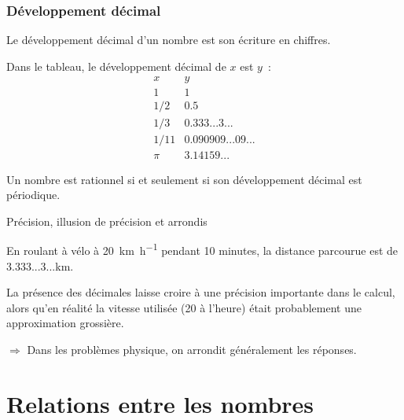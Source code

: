 \documentclass[french,xcolor=svgnames]{beamer}
\begin{document}
\begin{frame}
  \frametitle{Développement décimal}
  Le développement décimal d'un nombre est son écriture \og en chiffres\fg{}.\pause{}

  Dans le tableau, le développement décimal de \(x\) est \(y\)~:\pause{}
  \begin{equation*}
    \begin{array}{cc}
      x & y \\\hline
      1 & 1 \\
      1/2 & 0.5\\
      1/3 & 0.333...3...\\
      1/11 & 0.090909...09...\\
      \pi & 3.14159...
    \end{array}
  \end{equation*}

  \begin{theorem}\pause{}
    Un nombre est rationnel\pause{} si et seulement si son développement décimal est périodique.\pause{}
  \end{theorem}
\end{frame}
\begin{frame}{Précision, illusion de précision et arrondis}
  \begin{example}\pause{}
    En roulant à vélo à \SI{20}{\km\per\hour} pendant 10 minutes, la distance parcourue est de 3.333...3...\si{\km}.
  \end{example}\pause{}

  La présence des décimales laisse croire à une précision importante dans le calcul,\pause{} alors qu'en réalité la vitesse utilisée (20 à l'heure) était probablement une approximation grossière.\pause

  \(\Rightarrow\) Dans les problèmes physique, on arrondit généralement les réponses.\pause{}

\end{frame}

\section{Relations entre les nombres}
\end{document}
